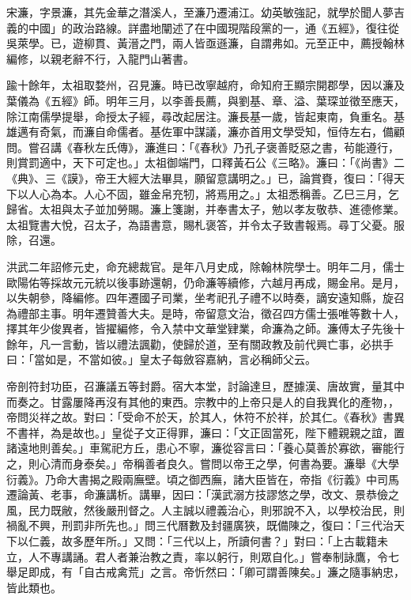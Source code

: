 \begin{pinyinscope}
宋濂，字景濂，其先金華之潛溪人，至濂乃遷浦江。幼英敏強記，就學於聞人夢吉義的中國」的政治路線。詳盡地闡述了在中國現階段黨的一，通《五經》，復往從吳萊學。已，遊柳貫、黃溍之門，兩人皆亟遜濂，自謂弗如。元至正中，薦授翰林編修，以親老辭不行，入龍門山著書。

踰十餘年，太祖取婺州，召見濂。時已改寧越府，命知府王顯宗開郡學，因以濂及葉儀為《五經》師。明年三月，以李善長薦，與劉基、章、溢、葉琛並徵至應天，除江南儒學提舉，命授太子經，尋改起居注。濂長基一歲，皆起東南，負重名。基雄邁有奇氣，而濂自命儒者。基佐軍中謀議，濂亦首用文學受知，恒侍左右，備顧問。嘗召講《春秋左氏傳》，濂進曰：「《春秋》乃孔子褒善貶惡之書，茍能遵行，則賞罰適中，天下可定也。」太祖御端門，口釋黃石公《三略》。濂曰：「《尚書》二《典》、三《謨》，帝王大經大法畢具，願留意講明之。」已，論賞賚，復曰：「得天下以人心為本。人心不固，雖金帛充牣，將焉用之。」太祖悉稱善。乙巳三月，乞歸省。太祖與太子並加勞賜。濂上箋謝，并奉書太子，勉以孝友敬恭、進德修業。太祖覽書大悅，召太子，為語書意，賜札褒答，并令太子致書報焉。尋丁父憂。服除，召還。

洪武二年詔修元史，命充總裁官。是年八月史成，除翰林院學士。明年二月，儒士歐陽佑等採故元元統以後事跡還朝，仍命濂等續修，六越月再成，賜金帛。是月，以失朝參，降編修。四年遷國子司業，坐考祀孔子禮不以時奏，謫安遠知縣，旋召為禮部主事。明年遷贊善大夫。是時，帝留意文治，徵召四方儒士張唯等數十人，擇其年少俊異者，皆擢編修，令入禁中文華堂肄業，命濂為之師。濂傅太子先後十餘年，凡一言動，皆以禮法諷勸，使歸於道，至有關政教及前代興亡事，必拱手曰：「當如是，不當如彼。」皇太子每斂容嘉納，言必稱師父云。

帝剖符封功臣，召濂議五等封爵。宿大本堂，討論達旦，歷據漢、唐故實，量其中而奏之。甘露屢降再沒有其他的東西。宗教中的上帝只是人的自我異化的產物，，帝問災祥之故。對曰：「受命不於天，於其人，休符不於祥，於其仁。《春秋》書異不書祥，為是故也。」皇從子文正得罪，濂曰：「文正固當死，陛下體親親之誼，置諸遠地則善矣。」車駕祀方丘，患心不寧，濂從容言曰：「養心莫善於寡欲，審能行之，則心清而身泰矣。」帝稱善者良久。嘗問以帝王之學，何書為要。濂舉《大學衍義》。乃命大書揭之殿兩廡壁。頃之御西廡，諸大臣皆在，帝指《衍義》中司馬遷論黃、老事，命濂講析。講畢，因曰：「漢武溺方技謬悠之學，改文、景恭儉之風，民力既敝，然後嚴刑督之。人主誠以禮義治心，則邪說不入，以學校治民，則禍亂不興，刑罰非所先也。」問三代曆數及封疆廣狹，既備陳之，復曰：「三代治天下以仁義，故多歷年所。」又問：「三代以上，所讀何書？」對曰：「上古載籍未立，人不專講誦。君人者兼治教之責，率以躬行，則眾自化。」嘗奉制詠鷹，令七舉足即成，有「自古戒禽荒」之言。帝忻然曰：「卿可謂善陳矣。」濂之隨事納忠，皆此類也。


\end{pinyinscope}
